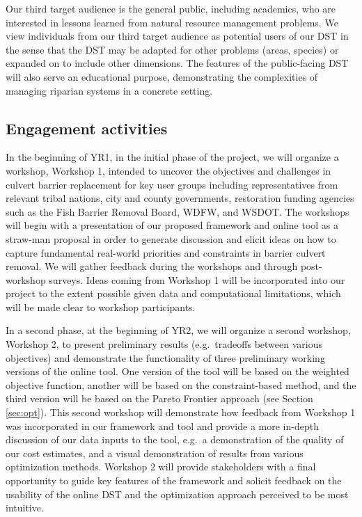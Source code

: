 \documentclass[12pt]{elsarticle}
\begin{document}
Our third target audience is the general public, including academics, who are interested in lessons learned from natural resource management problems. We view individuals from our third target audience as potential users of our DST in the sense that the DST may be adapted for other problems (areas, species) or expanded on to include other dimensions. The features of the public-facing DST will also serve an educational purpose, demonstrating the complexities of managing riparian systems in a concrete setting. 

\subsection*{Engagement activities}

In the beginning of YR1, in the initial phase of the project, we will organize a workshop, Workshop 1, intended to uncover the objectives and challenges in culvert barrier replacement for key user groups including representatives from relevant tribal nations, city and county governments, restoration funding agencies such as the Fish Barrier Removal Board, WDFW, and WSDOT. The workshops will begin with a presentation of our proposed framework and online tool as a straw-man proposal in order to generate discussion and elicit ideas on how to capture fundamental real-world priorities and constraints in barrier culvert removal. We will gather feedback during the workshops and through post-workshop surveys. Ideas coming from Workshop 1 will be incorporated into our project to the extent possible given data and computational limitations, which will be made clear to workshop participants.

In a second phase, at the beginning of YR2, we will organize a second workshop, Workshop 2, to present preliminary results (e.g.\ tradeoffs between various objectives) and demonstrate the functionality of three preliminary working versions of the online tool. One version of the tool will be based on the weighted objective function, another will be based on the constraint-based method, and the third version will be based on the Pareto Frontier approach (see Section \ref{sec:opt}). This second workshop will demonstrate how feedback from Workshop 1 was incorporated in our framework and tool and provide a more in-depth discussion of our data inputs to the tool, e.g.\ a demonstration of the quality of our cost estimates, and a visual demonstration of results from various optimization methods. Workshop 2 will provide stakeholders with a final opportunity to guide key features of the framework and solicit feedback on the usability of the online DST and the optimization approach perceived to be most intuitive. 
\end{document}
